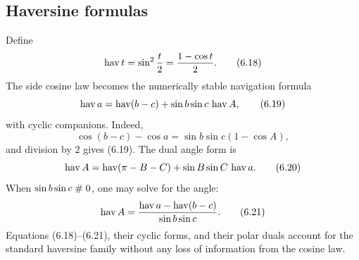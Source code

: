 \subsection{Haversine formulas}

Define
\begin{equation}
 \operatorname{hav} t=\sin^2\frac t2=\frac{1-\cos t}{2}.                 \tag{6.18}
\end{equation}
The side cosine law becomes the numerically stable navigation formula
\begin{equation}
 \operatorname{hav} a=\operatorname{hav}(b-c)+\sin b\sin c\,\operatorname{hav} A,                    \tag{6.19}
\end{equation}
with cyclic companions.  Indeed,
\[
 \cos(b-c)-\cos a=\sin b\sin c(1-\cos A),
\]
and division by \(2\) gives (6.19).  The dual angle form is
\begin{equation}
 \operatorname{hav} A=\operatorname{hav}(\pi-B-C)+\sin B\sin C\,\operatorname{hav} a.                \tag{6.20}
\end{equation}
When \(\sin b\sin c\mathrel{\#}0\), one may solve for the angle:
\begin{equation}
 \operatorname{hav} A=\frac{\operatorname{hav} a-\operatorname{hav}(b-c)}{\sin b\sin c}.             \tag{6.21}
\end{equation}
Equations (6.18)--(6.21), their cyclic forms, and their polar duals account for
the standard haversine family without any loss of information from the cosine
law.
